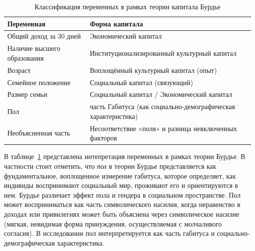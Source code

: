 \documentclass[14pt, a4paper]{article}
\begin{document}
	
	\begin{table}[htbp]
		\centering
		\caption{Классификация переменных в рамках теории капитала Бурдье}
		\label{tab:bourdieu_classification}
		\begin{tabular}{l l}
			\toprule\toprule
			Переменная & Форма капитала \\
			\midrule
			Общий доход за 30 дней 
			& Экономический капитал \\
			\addlinespace
			
			Наличие высшего образования 
			& Институционализированный культурный капитал \\
			\addlinespace
			
			Возраст 
			& Воплощённый культурный капитал (опыт) \\
			\addlinespace
			
			Семейное положение
			& Социальный капитал (связующий) \\
			\addlinespace
			
			Размер семьи 
			& Социальный капитал / Экономический капитал \\
			\addlinespace
			
			Пол
			& часть Габитуса (как социально-демографическая характеристика) \\
			\addlinespace
			
			\midrule
			Необъясненная часть 
			& Несоответствие «поля» и разница невключенных факторов \\
			\bottomrule
		\end{tabular}
	\end{table}
	
	В таблице~\ref{tab:bourdieu_classification}  представлена интепретация переменных в рамках теории Бурдье. В частности стоит отметить, что \textit{пол} в теории Бурдье представляется как фундаментальное, воплощенное измерение габитуса, которое определяет, как индивиды воспринимают социальный мир, проживают его и ориентируются в нем. Бурдье различает эффект пола и гендера в социальном пространстве. Пол может восприниматься как часть символического насилия, когда неравенство в доходах или привилегиях может быть объяснена через символическое насилие (мягкая, невидимая форма принуждения, осуществляемая с молчаливого согласия). В исследовании пол интерпретируется как часть габитуса и социально-демографическая характеристика.
	
\end{document}
